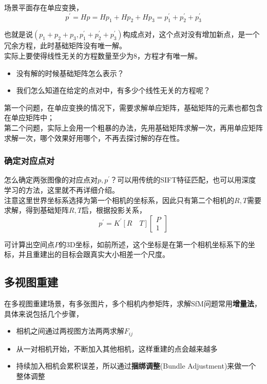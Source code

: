 		场景平面存在单应变换，
		$$
			p^\prime = Hp = Hp_1 + Hp_2 + Hp_3 = p^\prime_1+p^\prime_2+p^\prime_3
		$$

		也就是说$(p_1 + p_2 + p_3,p^\prime_1+p^\prime_2+p^\prime_3)$构成点对，这个点对没有增加新点，是一个冗余方程，此时基础矩阵没有唯一解。\\

		实际上要使得线性无关的方程数量至少为8，方程才有唯一解。

		\begin{itemize}
			\item 没有解的时候基础矩阵怎么表示？
			\item 我们怎么知道在给定的点对中，有多少个线性无关的方程呢？
		\end{itemize}

		第一个问题，在单应变换的情况下，需要求解单应矩阵，基础矩阵的元素也都包含在单应矩阵中；\\

		第二个问题，实际上会用一个粗暴的办法，先用基础矩阵求解一次，再用单应矩阵求解一次，哪个效果好用哪个，不再去探讨解的存在性。

	\subsubsection*{确定对应点对}
		怎么确定两张图像的对应点对$p,p^{\prime}$？可以用传统的SIFT特征匹配，也可以用深度学习的方法，这里就不再详细介绍。\\

	
	注意这里世界坐标系选择为第一个相机的坐标系，因此只有第二个相机的$R,T$需要求解，得到基础矩阵$R,T$后，根据投影关系，
	$$
		p^{\prime} = K^{\prime}[R\quad T]\begin{bmatrix}
			P\\
			1
		\end{bmatrix}
	$$

	可计算出空间点$P$的3D坐标，如前所述，这个坐标是在第一个相机坐标系下的坐标，并且重建出的目标会跟真实大小相差一个尺度。

	\subsection{多视图重建}
		在多视图重建场景，有多张图片，多个相机内参矩阵，求解SfM问题常用\textbf{增量法}，具体来说包括几个步骤，
	
	\begin{itemize}
		\item 相机之间通过两视图方法两两求解$F_{ij}$
		\item 从一对相机开始，不断加入其他相机，这样重建的点会越来越多
		\item 持续加入相机会累积误差，所以通过\textbf{捆绑调整}(Bundle Adjustment)来做一个整体调整
	\end{itemize}

